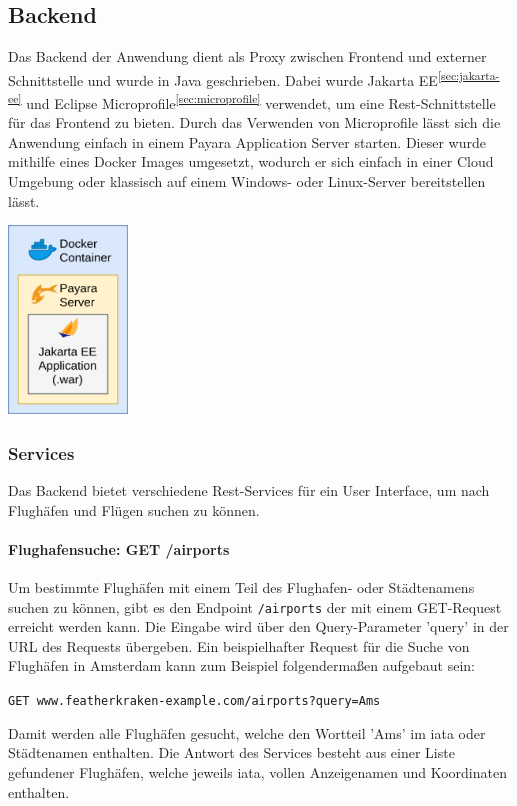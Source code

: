 \documentclass[12pt,twoside,a4paper]{article}
\begin{document}
\begin{sloppypar}
\subsection{Backend}
Das Backend der Anwendung dient als Proxy zwischen Frontend und externer Schnittstelle und wurde in Java geschrieben. Dabei wurde Jakarta EE\textsuperscript{\ref{sec:jakarta-ee}} und Eclipse Microprofile\textsuperscript{\ref{sec:microprofile}} verwendet, um eine Rest-Schnittstelle für das Frontend zu bieten. Durch das Verwenden von Microprofile lässt sich die Anwendung einfach in einem Payara Application Server starten. Dieser wurde mithilfe eines Docker Images umgesetzt, wodurch er sich einfach in einer Cloud Umgebung oder klassisch auf einem Windows- oder Linux-Server bereitstellen lässt.
\begin{center}
	\captionsetup{type=figure}
	\includegraphics[height=5cm]{images/backend-structure}
\end{center}
\subsubsection{Services}
Das Backend bietet verschiedene Rest-Services für ein User Interface, um nach Flughäfen und Flügen suchen zu können.
\paragraph[Flughafensuche]{Flughafensuche: GET /airports}\label{sec:airport-search}
Um bestimmte Flughäfen mit einem Teil des Flughafen- oder Städtenamens suchen zu können, gibt es den Endpoint \texttt{/airports} der mit einem GET-Request erreicht werden kann. Die Eingabe wird über den Query-Parameter 'query' in der URL des Requests übergeben. Ein beispielhafter Request für die Suche von Flughäfen in Amsterdam kann zum Beispiel folgendermaßen aufgebaut sein:\\
\begin{center}
	\texttt{GET www.featherkraken-example.com/airports?query=Ams}
\end{center}
Damit werden alle Flughäfen gesucht, welche den Wortteil 'Ams' im \acrlong{iata} oder Städtenamen enthalten. Die Antwort des Services besteht aus einer Liste gefundener Flughäfen, welche jeweils \acrlong{iata}, vollen Anzeigenamen und Koordinaten enthalten.

\end{sloppypar}
\end{document}
